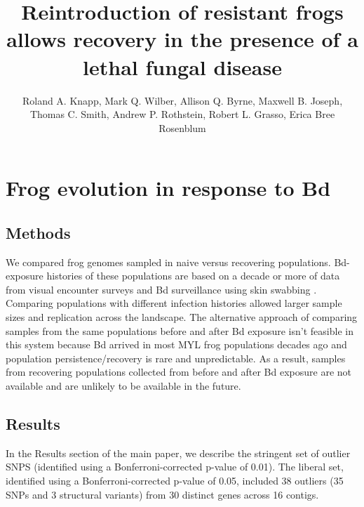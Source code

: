 \documentclass[9pt,twoside,lineno]{pnas-new}
\title{Reintroduction of resistant frogs allows recovery in the presence of a lethal fungal disease}
\author{Roland A. Knapp, Mark Q. Wilber, Allison Q. Byrne, Maxwell B. Joseph, Thomas C. Smith, Andrew P. Rothstein, Robert L. Grasso, Erica Bree Rosenblum}
\begin{document}
\maketitle

\SItext
\hypertarget{frog-evolution-in-response-to-bd-2}{%
\section{Frog evolution in response to
Bd}\label{frog-evolution-in-response-to-bd-2}}

\hypertarget{methods}{%
\subsection{Methods}\label{methods}}

We compared frog genomes sampled in naive versus recovering populations.
Bd-exposure histories of these populations are based on a decade or more
of data from visual encounter surveys and Bd surveillance using skin
swabbing \citep[e.g.,][]{knapp2016}. Comparing populations with
different infection histories allowed larger sample sizes and
replication across the landscape. The alternative approach of comparing
samples from the same populations before and after Bd exposure isn't
feasible in this system because Bd arrived in most MYL frog populations
decades ago and population persistence/recovery is rare and
unpredictable. As a result, samples from recovering populations
collected from before and after Bd exposure are not available and are
unlikely to be available in the future.

\hypertarget{results-1}{%
\subsection{Results}\label{results-1}}

In the Results section of the main paper, we describe the stringent set
of outlier SNPS (identified using a Bonferroni-corrected p-value of
0.01). The liberal set, identified using a Bonferroni-corrected p-value
of 0.05, included 38 outliers (35 SNPs and 3 structural variants) from
30 distinct genes across 16 contigs.
\end{document}
